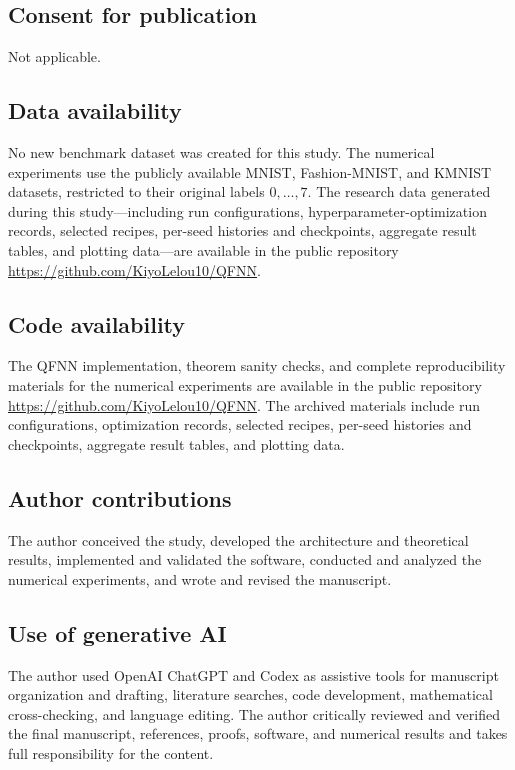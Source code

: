 \documentclass[pdflatex,sn-mathphys,NameDate,iicol]{sn-jnl}
\begin{document}
\subsection*{Consent for publication}
Not applicable.

\subsection*{Data availability}
No new benchmark dataset was created for this study. The numerical experiments
use the publicly available MNIST, Fashion-MNIST, and KMNIST datasets,
restricted to their original labels $0,\ldots,7$. The research data generated
during this study---including run configurations, hyperparameter-optimization
records, selected recipes, per-seed histories and checkpoints, aggregate result
tables, and plotting data---are available in the public repository
\url{https://github.com/KiyoLelou10/QFNN}.

\subsection*{Code availability}
The QFNN implementation, theorem sanity checks, and complete reproducibility
materials for the numerical experiments are available in the public repository
\url{https://github.com/KiyoLelou10/QFNN}. The archived materials include run configurations, optimization
records, selected recipes, per-seed histories and checkpoints, aggregate
result tables, and plotting data.

\subsection*{Author contributions}
The author conceived the study, developed the architecture and theoretical
results, implemented and validated the software, conducted and analyzed the
numerical experiments, and wrote and revised the manuscript.

\subsection*{Use of generative AI}
The author used OpenAI ChatGPT and Codex as assistive tools for manuscript
organization and drafting, literature searches, code development, mathematical
cross-checking, and language editing. The author critically reviewed and
verified the final manuscript, references, proofs, software, and numerical
results and takes full responsibility for the content.
\end{document}
